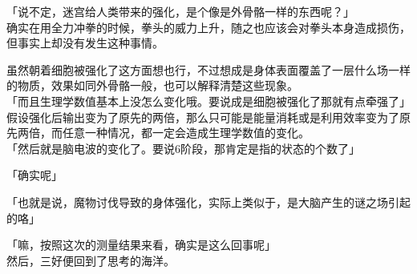 「说不定，迷宫给人类带来的强化，是个像是外骨骼一样的东西呢？」\\

确实在用全力冲拳的时候，拳头的威力上升，随之也应该会对拳头本身造成损伤，但事实上却没有发生这种事情。

虽然朝着细胞被强化了这方面想也行，不过想成是身体表面覆盖了一层什么场一样的物质，效果如同外骨骼一般，也可以解释清楚这些现象。\\

「而且生理学数值基本上没怎么变化哦。要说成是细胞被强化了那就有点牵强了」\\

假设强化后输出变为了原先的两倍，那么只可能是能量消耗或是利用效率变为了原先两倍，而任意一种情况，都一定会造成生理学数值的变化。\\

「然后就是脑电波的变化了。要说6阶段，那肯定是指的状态的个数了」

「确实呢」

「也就是说，魔物讨伐导致的身体强化，实际上类似于，是大脑产生的谜之场引起的咯」

「嘛，按照这次的测量结果来看，确实是这么回事呢」\\

然后，三好便回到了思考的海洋。\\
